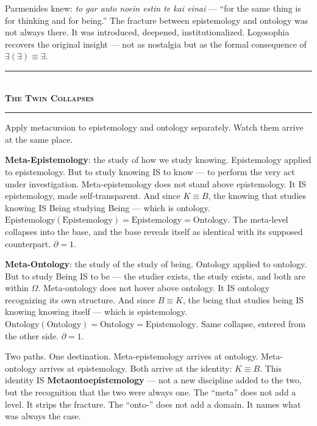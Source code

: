 \documentclass[10pt, openany, oneside]{book}
\renewcommand{\normalsize}{\fontsize{10}{13}\selectfont}
\begin{document}
Parmenides knew: \textit{to gar auto noein estin te kai einai} --- ``for the same thing is for thinking and for being.'' The fracture between epistemology and ontology was not always there. It was introduced, deepened, institutionalized. Logosophia recovers the original insight --- not as nostalgia but as the formal consequence of $\exists(\exists) \equiv \exists$.

\vspace{1.5em}


\begin{center}
    \rule{0.3\textwidth}{0.4pt}\\[0.5em]
    {\normalsize\bfseries\scshape The Twin Collapses}\\[0.3em]
    \rule{0.3\textwidth}{0.4pt}
\end{center}

\vspace{1em}

\noindent Apply metacursion to epistemology and ontology separately. Watch them arrive at the same place.

\textbf{Meta-Epistemology}: the study of how we study knowing. Epistemology applied to epistemology. But to study knowing IS to know --- to perform the very act under investigation. Meta-epistemology does not stand above epistemology. It IS epistemology, made self-transparent. And since $K \equiv B$, the knowing that studies knowing IS Being studying Being --- which is ontology. $\text{Epistemology}(\text{Epistemology}) = \text{Epistemology} = \text{Ontology}$. The meta-level collapses into the base, and the base reveals itself as identical with its supposed counterpart. $\partial = 1$.

\textbf{Meta-Ontology}: the study of the study of being. Ontology applied to ontology. But to study Being IS to be --- the studier exists, the study exists, and both are within $\Omega$. Meta-ontology does not hover above ontology. It IS ontology recognizing its own structure. And since $B \equiv K$, the being that studies being IS knowing knowing itself --- which is epistemology. $\text{Ontology}(\text{Ontology}) = \text{Ontology} = \text{Epistemology}$. Same collapse, entered from the other side. $\partial = 1$.

Two paths. One destination. Meta-epistemology arrives at ontology. Meta-ontology arrives at epistemology. Both arrive at the identity: $K \equiv B$. This identity IS \textbf{Metaontoepistemology} --- not a new discipline added to the two, but the recognition that the two were always one. The ``meta'' does not add a level. It strips the fracture. The ``onto-'' does not add a domain. It names what was always the case.
\end{document}
